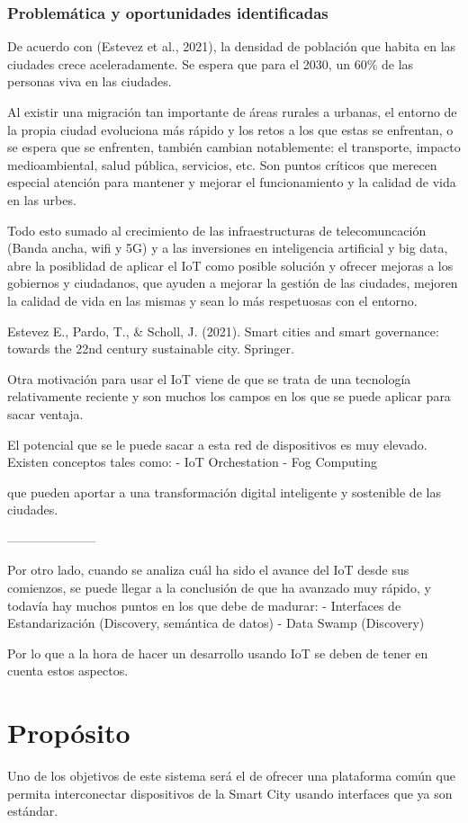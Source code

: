 \documentclass[12pt, a4paper, twoside]{article}
\begin{document}
\subsubsection{Problemática y oportunidades identificadas}
De acuerdo con (Estevez et al., 2021), la densidad de población que habita en las ciudades crece aceleradamente.
Se espera que para el 2030, un 60\% de las personas viva en las ciudades. 

Al existir una migración tan importante de áreas rurales a urbanas, el entorno de la
propia ciudad evoluciona más rápido y los retos a los que estas se enfrentan, o se espera que se enfrenten,
también cambian notablemente: el transporte, impacto medioambiental, salud pública, servicios, etc. Son puntos
críticos que merecen especial atención para mantener y mejorar el funcionamiento y la calidad de vida en
las urbes.

Todo esto sumado al crecimiento de las infraestructuras de telecomuncación (Banda ancha, wifi y 5G)
y a las inversiones en inteligencia artificial y big data, abre la posiblidad de aplicar el IoT como
posible solución y ofrecer mejoras a los gobiernos y ciudadanos, que ayuden a mejorar la gestión de las 
ciudades, mejoren la calidad de vida en las mismas y sean lo más respetuosas con el entorno.

Estevez E., Pardo, T., \& Scholl, J. (2021).
Smart cities and smart governance: towards the 22nd century sustainable city. Springer.


Otra motivación para usar el IoT viene de que se trata de  una tecnología relativamente reciente 
y son muchos los campos en los que se puede aplicar para sacar ventaja.

El potencial que se le puede sacar a esta red de dispositivos es muy elevado. Existen conceptos tales como:
 - IoT Orchestation
 - Fog Computing

que pueden aportar a una transformación digital inteligente y sostenible de las ciudades.


 ---------------------

Por otro lado, cuando se analiza cuál ha sido el avance del IoT desde sus comienzos,
se puede llegar a la conclusión de que ha avanzado muy rápido, y todavía hay muchos 
puntos en los que debe de madurar:
 - Interfaces de Estandarización (Discovery, semántica de datos)
 - Data Swamp (Discovery)

Por lo que a la hora de hacer un desarrollo usando IoT se deben de tener en cuenta estos aspectos.

\section{Propósito}
Uno de los objetivos de este sistema será el de ofrecer una plataforma común que
permita interconectar dispositivos de la Smart City usando interfaces que ya son estándar.
\end{document}
